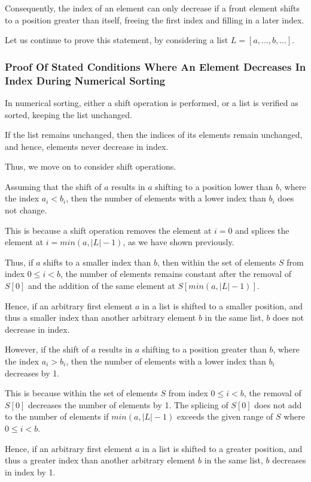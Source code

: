 \documentclass[12pt]{article}
\begin{document}
Consequently, the index of an element can only decrease if a front element shifts to a position greater than itself, freeing the first index and filling in a later index.

Let us continue to prove this statement, by considering a list $L = [a,...,b,...]$.

\subsubsection{Proof Of Stated Conditions Where An Element Decreases In Index During Numerical Sorting}

In numerical sorting, either a shift operation is performed, or a list is verified as sorted, keeping the list unchanged.

If the list remains unchanged, then the indices of its elements remain unchanged, and hence, elements never decrease in index.

Thus, we move on to consider shift operations.

Assuming that the shift of $a$ results in $a$ shifting to a position lower than $b$, where the index $a_i<b_i$, then the number of elements with a lower index than $b_i$ does not change.

This is because a shift operation removes the element at $i=0$ and splices the element at $i=min(a,|L|-1)$, as we have shown previously.

Thus, if $a$ shifts to a smaller index than $b$, then within the set of elements $S$ from index $0 \leq i < b$, the number of elements remains constant after the removal of $S[0]$ and the addition of the same element at $S[min(a,|L|-1)]$.

Hence, if an arbitrary first element $a$ in a list is shifted to a smaller position, and thus a smaller index than another arbitrary element $b$ in the same list, $b$ does not decrease in index.

However, if the shift of $a$ results in $a$ shifting to a position greater than $b$, where the index $a_i>b_i$, then the number of elements with a lower index than $b_i$ decreases by 1.

This is because within the set of elements $S$ from index $0 \leq i < b$, the removal of $S[0]$ decreases the number of elements by 1. The splicing of $S[0]$ does not add to the number of elements if $min(a,|L|-1)$ exceeds the given range of $S$ where $0 \leq i < b$.

Hence, if an arbitrary first element $a$ in a list is shifted to a greater position, and thus a greater index than another arbitrary element $b$ in the same list, $b$ decreases in index by 1.
\end{document}
